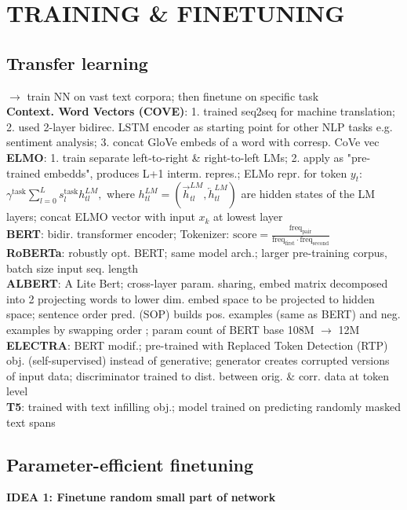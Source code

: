 \section{TRAINING \& FINETUNING}

\subsection{Transfer learning}

$\rightarrow$ train NN on vast text corpora; then finetune on specific task\\
\textbf{Context. Word Vectors (COVE)}: 1. trained seq2seq for machine translation; 2. used 2-layer bidirec. LSTM encoder as starting point for other NLP tasks e.g. sentiment analysis; 3. concat GloVe embeds of a word with corresp. CoVe vec \\
\textbf{ELMO}: 1. train separate left-to-right \& right-to-left LMs; 2. apply as "pre-trained embedds", produces L+1 interm. repres.; ELMo repr. for token $y_t$: $\gamma^{\text{task}}\sum_{l=0}^{L} s_l^{\text{task}}h_{tl}^{LM},$ where $h_{tl}^{LM}=(\overrightarrow{h}_{tl}^{LM}, \overleftarrow{h}_{tl}^{LM})$ are hidden states of the LM layers; concat ELMO vector with input $x_k$ at lowest layer\\
\textbf{BERT}: bidir. transformer encoder; Tokenizer: $\text{score} = \frac{\mathrm{freq}_{\mathrm{pair}}}{\mathrm{freq}_{\mathrm{first}} \cdot \mathrm{freq}_{\mathrm{second}}}$\\
\textbf{RoBERTa}: robustly opt. BERT; same model arch.; larger pre-training corpus, batch size input seq. length\\
\textbf{ALBERT}: A Lite Bert; cross-layer param. sharing, embed matrix decomposed into 2 projecting words to lower dim. embed space to be projected to hidden space; sentence order pred. (SOP) builds pos. examples (same as BERT) and neg. examples by swapping order ; param count of BERT base 108M $\rightarrow$ 12M\\
\textbf{ELECTRA}: BERT modif.; pre-trained with Replaced Token Detection (RTP) obj. (self-supervised) instead of generative; generator creates corrupted versions of input data; discriminator trained to dist. between orig. \& corr. data at token level\\
\textbf{T5}: trained with text infilling obj.; model trained on predicting randomly masked text spans

\subsection{Parameter-efficient finetuning}
\textbf{IDEA 1: Finetune random small part of network}


